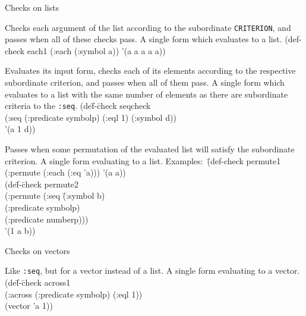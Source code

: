 \begin{criteriaGroup}{Checks on lists}

{Checks each argument of the list according to the subordinate
\texttt{CRITERION}, and passes when all of these checks pass.}
{A single form which evaluates to a list.}
{\noExpl}
{\singleEx}
{(def-check each1 (:each (:symbol a)) '(a a a a a))}

{Evaluates its input form, checks each of its elements according to
the respective subordinate criterion, and passes when all of them
pass.}
{A single form which evaluates to a list with the same number of
elements as there are subordinate criteria to the
\texttt{:seq}.}
{}
{\tabbingEx}{
(de\=f-\=check seqcheck
\\ \>\>  (:seq (:predicate symbolp) (:eql 1) (:symbol d))
\\ \>  '(a 1 d))
}

{Passes when some permutation of the evaluated list will satisfy the
subordinate criterion.}
{A single form evaluating to a list.}
{\noExpl}{\tabbingEx}{
\textrm{Examples:}\ \=(def-check permute1 (:permute (:each (:eq 'a))) '(a a))
\\ \> (de\=f-\=check permute2
\\ \> \> \> (:permute (:seq \=(:symbol b)
\\ \> \> \>             \>(:predicate symbolp)
\\ \> \> \>             \>(:predicate numberp)))
\\ \> \>'(1 a b))
}

\end{criteriaGroup}

\begin{criteriaGroup}{Checks on vectors}

{Like \texttt{:seq}, but for a vector instead of a list.}
{A single form evaluating to a vector.}
{\noExpl}{\tabbingEx}{
(de\=f-\=check across1
\\ \>\>  (:across (:predicate symbolp) (:eql 1))
\\ \>  (vector 'a 1))}

\end{criteriaGroup}

